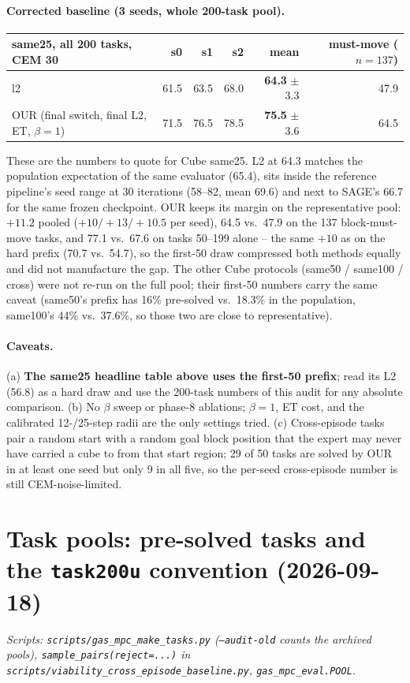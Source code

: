 \documentclass[11pt]{article}
\begin{document}
\paragraph{Corrected baseline (3 seeds, whole 200-task pool).}
\begin{center}\small
\begin{tabular}{lrrrrr}
\toprule
same25, all 200 tasks, CEM 30 & s0 & s1 & s2 & mean & must-move ($n{=}137$) \\
\midrule
l2 & 61.5 & 63.5 & 68.0 & \textbf{64.3} $\pm$ 3.3 & 47.9 \\
OUR (final switch, final L2, ET, $\beta=1$) & 71.5 & 76.5 & 78.5 & \textbf{75.5} $\pm$ 3.6 & 64.5 \\
\bottomrule
\end{tabular}
\end{center}
These are the numbers to quote for Cube same25. L2 at 64.3 matches the population expectation
of the same evaluator (65.4), sits inside the reference pipeline's seed range at 30 iterations
(58--82, mean 69.6) and next to SAGE's 66.7 for the same frozen checkpoint. OUR keeps its margin
on the representative pool: $+11.2$ pooled ($+10/{+}13/{+}10.5$ per seed), 64.5 vs.\ 47.9 on
the 137 block-must-move tasks, and 77.1 vs.\ 67.6 on tasks 50--199 alone -- the same
$+10$ as on the hard prefix (70.7 vs.\ 54.7), so the first-50 draw compressed both methods
equally and did not manufacture the gap. The other Cube
protocols (same50 / same100 / cross) were not re-run on the full pool; their first-50 numbers
carry the same caveat (same50's prefix has 16\% pre-solved vs.\ 18.3\% in the population,
same100's 44\% vs.\ 37.6\%, so those two are close to representative).

\paragraph{Caveats.} (a) \textbf{The same25 headline table above uses the first-50 prefix}; read
its L2 (56.8) as a hard draw and use the 200-task numbers of this audit for any absolute
comparison. (b) No $\beta$ sweep or phase-8 ablations; $\beta=1$, ET cost, and the
calibrated 12-/25-step radii are the only settings tried. (c) Cross-episode tasks pair a
random start with a random goal block position that the expert may never have carried a
cube to from that start region; 29 of 50 tasks are solved by OUR in at least one seed but only
9 in all five, so the per-seed cross-episode number is still CEM-noise-limited.

\section{Task pools: pre-solved tasks and the \texttt{task200u} convention (2026-09-18)}
\label{sec:task-pools}
\emph{Scripts: \texttt{scripts/gas\_mpc\_make\_tasks.py} (\texttt{--audit-old} counts the
archived pools), \texttt{sample\_pairs(reject=...)} in
\texttt{scripts/viability\_cross\_episode\_baseline.py}, \texttt{gas\_mpc\_eval.POOL}.}
\end{document}
